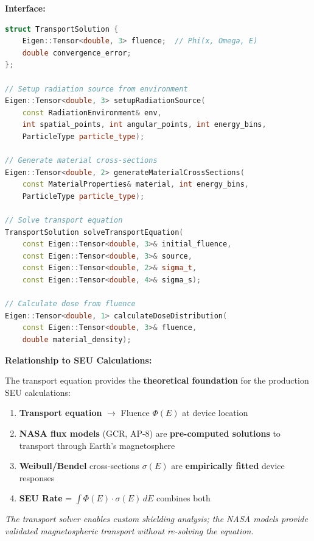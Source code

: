 \documentclass[11pt,a4paper]{article}
\begin{document}
\textbf{Interface:}
\begin{lstlisting}[language=C++, basicstyle=\footnotesize\ttfamily]
struct TransportSolution {
    Eigen::Tensor<double, 3> fluence;  // Phi(x, Omega, E)
    double convergence_error;
};

// Setup radiation source from environment
Eigen::Tensor<double, 3> setupRadiationSource(
    const RadiationEnvironment& env,
    int spatial_points, int angular_points, int energy_bins,
    ParticleType particle_type);

// Generate material cross-sections
Eigen::Tensor<double, 2> generateMaterialCrossSections(
    const MaterialProperties& material, int energy_bins,
    ParticleType particle_type);

// Solve transport equation
TransportSolution solveTransportEquation(
    const Eigen::Tensor<double, 3>& initial_fluence,
    const Eigen::Tensor<double, 3>& source,
    const Eigen::Tensor<double, 2>& sigma_t,
    const Eigen::Tensor<double, 4>& sigma_s);

// Calculate dose from fluence
Eigen::Tensor<double, 1> calculateDoseDistribution(
    const Eigen::Tensor<double, 3>& fluence,
    double material_density);
\end{lstlisting}

\textbf{Relationship to SEU Calculations:}

\begin{tcolorbox}[colback=green!5!white,colframe=green!50!black,title=Transport $\to$ SEU Connection]
The transport equation provides the \textbf{theoretical foundation} for the production SEU calculations:
\begin{enumerate}
    \item \textbf{Transport equation} $\to$ Fluence $\Phi(E)$ at device location
    \item \textbf{NASA flux models} (GCR, AP-8) are \textbf{pre-computed solutions} to transport through Earth's magnetosphere
    \item \textbf{Weibull/Bendel} cross-sections $\sigma(E)$ are \textbf{empirically fitted} device responses
    \item \textbf{SEU Rate} = $\int \Phi(E) \cdot \sigma(E) \, dE$ combines both
\end{enumerate}

\textit{The transport solver enables custom shielding analysis; the NASA models provide validated magnetospheric transport without re-solving the equation.}
\end{tcolorbox}
\end{document}

